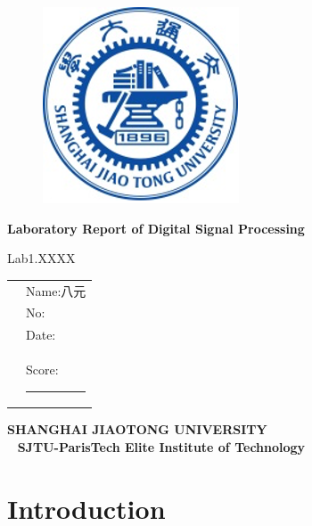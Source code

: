 \documentclass{article}
\newcommand{\xiaoer}{\fontsize{18pt}{18pt}\selectfont}
\newcommand{\xiaosan}{\fontsize{15pt}{22pt}\selectfont}
\begin{document}
\begin{figure}[htbp]
\flushright
\includegraphics[width = 0.25 \linewidth]{./image/log.png}
\end{figure}

\vspace{40pt}

\centerline{\xiaoer\textbf{Laboratory Report of Digital Signal Processing}}

\vspace{10pt}
\centerline{\xiaosan Lab1.XXXX} %


\vspace{80pt}


\begin{center}
 \begin{tabular}{rl}
  \vspace{10pt}
  &\xiaosan Name:八元\\
  \vspace{10pt}
  &\xiaosan No:\\
  \vspace{10pt}
  &\xiaosan Date:\\
  \vspace{10pt}
  &\xiaosan Score:\rule{3cm}{0.15mm}\\
  \end{tabular}
\end{center}
\vspace{100pt}

\begin{center}
\vspace{10pt}
{\xiaosan\textbf{SHANGHAI JIAOTONG UNIVERSITY}}\\   %
{\xiaosan\textbf{SJTU-ParisTech Elite Institute of Technology}} %
\end{center}

\newpage
\tableofcontents
\newpage


\section{Introduction}
\end{document}
